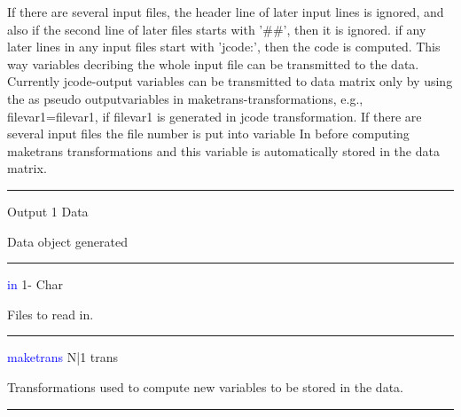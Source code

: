 If there are several input files, the header line of later input lines is ignored, and
also if the second line of later files starts with '\#\#', then it is ignored.
if any later lines in any input files start with 'jcode:', then the code is computed.
This way variables decribing the whole input file can be transmitted to the data.
Currently jcode-output variables can be transmitted to data matrix only by using the as pseudo
outputvariables in maketrans-transformations, e.g., filevar1=filevar1, if
filevar1 is generated in jcode transformation.
If there are several input files the file number is put into variable In before computing maketrans transformations
and this variable is automatically stored in the data matrix.
\vspace{0.3cm}
\hrule
\vspace{0.3cm}
\noindent Output \tabto{3cm} 1 \tabto{5cm}  Data \tabto{7cm}
\begin{changemargin}{3cm}{0cm}
\noindent  Data object generated
\end{changemargin}
\vspace{0.3cm}
\hrule
\vspace{0.3cm}
\noindent \textcolor{blue}{in} \tabto{3cm} 1- \tabto{5cm}  Char \tabto{7cm}
\begin{changemargin}{3cm}{0cm}
\noindent Files to read in.
\end{changemargin}
\vspace{0.3cm}
\hrule
\vspace{0.3cm}
\noindent \textcolor{blue}{maketrans} \tabto{3cm} N|1 \tabto{5cm}  trans \tabto{7cm}
\begin{changemargin}{3cm}{0cm}
\noindent  Transformations used to compute new variables to be stored
in the data.
\end {changemargin}
\hrule
\vspace{0.2cm}
